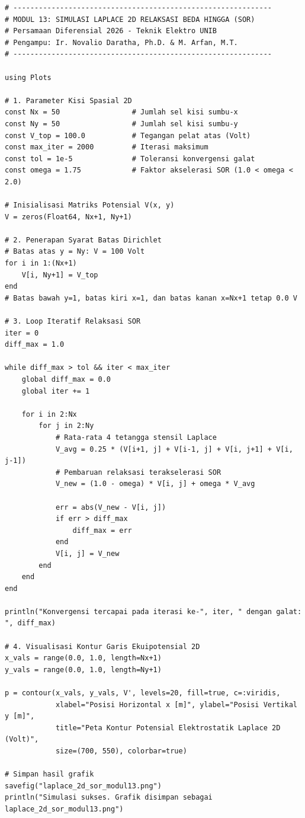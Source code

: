 \documentclass[11pt,a4paper]{article}
\theoremstyle{definition}
\begin{document}
\begin{lstlisting}[style=juliastyle, caption={Skrip Julia penyelesaian Persamaan Laplace 2D dengan metode relaksasi SOR.}, label={lst:julia_laplace_sor}]
# -------------------------------------------------------------
# MODUL 13: SIMULASI LAPLACE 2D RELAKSASI BEDA HINGGA (SOR)
# Persamaan Diferensial 2026 - Teknik Elektro UNIB
# Pengampu: Ir. Novalio Daratha, Ph.D. & M. Arfan, M.T.
# -------------------------------------------------------------

using Plots

# 1. Parameter Kisi Spasial 2D
const Nx = 50                 # Jumlah sel kisi sumbu-x
const Ny = 50                 # Jumlah sel kisi sumbu-y
const V_top = 100.0           # Tegangan pelat atas (Volt)
const max_iter = 2000         # Iterasi maksimum
const tol = 1e-5              # Toleransi konvergensi galat
const omega = 1.75            # Faktor akselerasi SOR (1.0 < omega < 2.0)

# Inisialisasi Matriks Potensial V(x, y)
V = zeros(Float64, Nx+1, Ny+1)

# 2. Penerapan Syarat Batas Dirichlet
# Batas atas y = Ny: V = 100 Volt
for i in 1:(Nx+1)
    V[i, Ny+1] = V_top
end
# Batas bawah y=1, batas kiri x=1, dan batas kanan x=Nx+1 tetap 0.0 V

# 3. Loop Iteratif Relaksasi SOR
iter = 0
diff_max = 1.0

while diff_max > tol && iter < max_iter
    global diff_max = 0.0
    global iter += 1
    
    for i in 2:Nx
        for j in 2:Ny
            # Rata-rata 4 tetangga stensil Laplace
            V_avg = 0.25 * (V[i+1, j] + V[i-1, j] + V[i, j+1] + V[i, j-1])
            # Pembaruan relaksasi terakselerasi SOR
            V_new = (1.0 - omega) * V[i, j] + omega * V_avg
            
            err = abs(V_new - V[i, j])
            if err > diff_max
                diff_max = err
            end
            V[i, j] = V_new
        end
    end
end

println("Konvergensi tercapai pada iterasi ke-", iter, " dengan galat: ", diff_max)

# 4. Visualisasi Kontur Garis Ekuipotensial 2D
x_vals = range(0.0, 1.0, length=Nx+1)
y_vals = range(0.0, 1.0, length=Ny+1)

p = contour(x_vals, y_vals, V', levels=20, fill=true, c=:viridis,
            xlabel="Posisi Horizontal x [m]", ylabel="Posisi Vertikal y [m]",
            title="Peta Kontur Potensial Elektrostatik Laplace 2D (Volt)",
            size=(700, 550), colorbar=true)

# Simpan hasil grafik
savefig("laplace_2d_sor_modul13.png")
println("Simulasi sukses. Grafik disimpan sebagai laplace_2d_sor_modul13.png")
\end{lstlisting}
\end{document}
